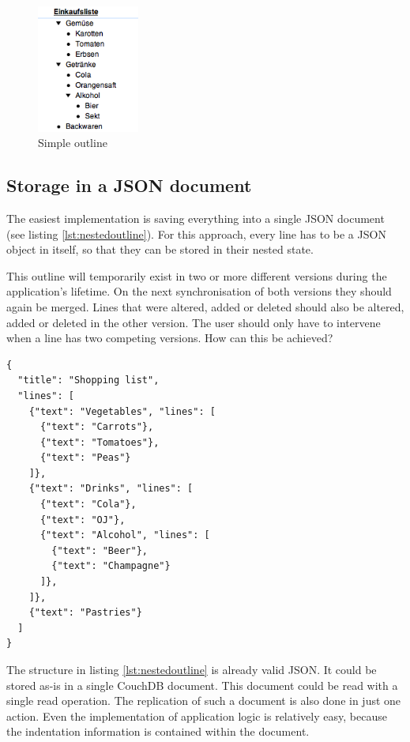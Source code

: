 \medskip
\begin{figure}[ht] 
  \begin{center}
    \includegraphics[width=0.3\textwidth]{grafik/nested-outline} 
  \end{center}
  \caption{Simple outline}
  \label{fig:nestedoutline}
\end{figure}

\subsection{Storage in a JSON document}

The easiest implementation is saving everything into a single JSON document (see listing \ref{lst:nestedoutline}). For this approach, every line has to be a JSON object in itself, so that they can be stored in their nested state.

This outline will temporarily exist in two or more different versions during the application's lifetime. On the next synchronisation of both versions they should again be merged. Lines that were altered, added or deleted should also be altered, added or deleted in the other version. The user should only have to intervene when a line has two competing versions. How can this be achieved?

\medskip
\begin{lstlisting}[caption=Simple outline in a JSON document, label={lst:nestedoutline}]
{
  "title": "Shopping list",
  "lines": [
    {"text": "Vegetables", "lines": [
      {"text": "Carrots"},
      {"text": "Tomatoes"}, 
      {"text": "Peas"}
    ]}, 
    {"text": "Drinks", "lines": [
      {"text": "Cola"},
      {"text": "OJ"}, 
      {"text": "Alcohol", "lines": [
        {"text": "Beer"},
        {"text": "Champagne"}
      ]},
    ]},
    {"text": "Pastries"}
  ]
}
\end{lstlisting}


The structure in listing \ref{lst:nestedoutline} is already valid JSON. It could be stored as-is in a single CouchDB document. This document could be read with a single read operation. The replication of such a document is also done in just one action. Even the implementation of application logic is relatively easy, because the indentation information is contained within the document.

